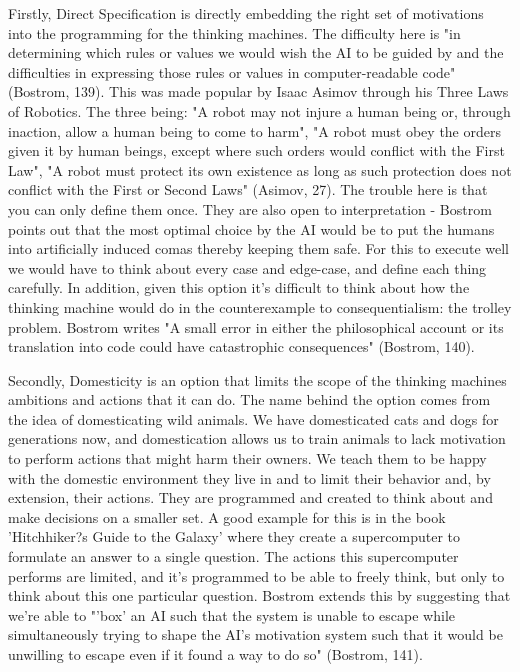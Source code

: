 \documentclass[11pt, oneside]{article}
\begin{document}
\par Firstly, Direct Specification is directly embedding the right set of motivations into the programming for the thinking machines. The difficulty here is "in determining which rules or values we would wish the AI to be guided by and the difficulties in expressing those rules or values in computer-readable code" (Bostrom, 139). This was made popular by Isaac Asimov through his Three Laws of Robotics. The three being: "A robot may not injure a human being or, through inaction, allow a human being to come to harm", "A robot must obey the orders given it by human beings, except where such orders would conflict with the First Law", "A robot must protect its own existence as long as such protection does not conflict with the First or Second Laws" (Asimov, 27). The trouble here is that you can only define them once. They are also open to interpretation - Bostrom points out that the most optimal choice by the AI would be to put the humans into artificially induced comas thereby keeping them safe. For this to execute well we would have to think about every case and edge-case, and define each thing carefully. In addition, given this option it's difficult to think about how the thinking machine would do in the counterexample to consequentialism: the trolley problem. Bostrom writes "A small error in either the philosophical account or its translation into code could have catastrophic consequences" (Bostrom, 140).
 
\par Secondly, Domesticity is an option that limits the scope of the thinking machines ambitions and actions that it can do. The name behind the option comes from the idea of domesticating wild animals. We have domesticated cats and dogs for generations now, and domestication allows us to train animals to lack motivation to perform actions that might harm their owners. We teach them to be happy with the domestic environment they live in and to limit their behavior and, by extension, their actions. They are programmed and created to think about and make decisions on a smaller set. A good example for this is in the book 'Hitchhiker?s Guide to the Galaxy' where they create a supercomputer to formulate an answer to a single question. The actions this supercomputer performs are limited, and it's programmed to be able to freely think, but only to think about this one particular question. Bostrom extends this by suggesting that we're able to "'box' an AI such that the system is unable to escape while simultaneously trying to shape the AI's motivation system such that it would be unwilling to escape even if it found a way to do so" (Bostrom, 141).
 
\end{document}
